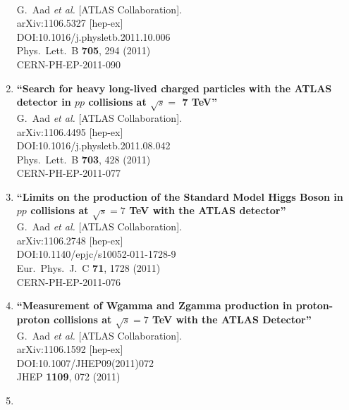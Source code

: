 \documentclass{article}
\begin{document}
\begin{enumerate}
  \\{}G.~Aad {\it et al.} [ATLAS Collaboration].
  \\{}arXiv:1106.5327 [hep-ex]
  \\{}DOI:10.1016/j.physletb.2011.10.006
  \\{}Phys.\ Lett.\ B {\bf 705}, 294 (2011)
  \\{}CERN-PH-EP-2011-090
\item%
{\bf ``Search for heavy long-lived charged particles with the ATLAS detector in $pp$ collisions at $\sqrt{s}=$ 7 TeV''}
  \\{}G.~Aad {\it et al.} [ATLAS Collaboration].
  \\{}arXiv:1106.4495 [hep-ex]
  \\{}DOI:10.1016/j.physletb.2011.08.042
  \\{}Phys.\ Lett.\ B {\bf 703}, 428 (2011)
  \\{}CERN-PH-EP-2011-077
\item%
{\bf ``Limits on the production of the Standard Model Higgs Boson in $pp$ collisions at $\sqrt{s}=7$ TeV with the ATLAS detector''}
  \\{}G.~Aad {\it et al.} [ATLAS Collaboration].
  \\{}arXiv:1106.2748 [hep-ex]
  \\{}DOI:10.1140/epjc/s10052-011-1728-9
  \\{}Eur.\ Phys.\ J.\ C {\bf 71}, 1728 (2011)
  \\{}CERN-PH-EP-2011-076
\item%
{\bf ``Measurement of Wgamma and Zgamma production in proton-proton collisions at $\sqrt{s}=7$ TeV with the ATLAS Detector''}
  \\{}G.~Aad {\it et al.} [ATLAS Collaboration].
  \\{}arXiv:1106.1592 [hep-ex]
  \\{}DOI:10.1007/JHEP09(2011)072
  \\{}JHEP {\bf 1109}, 072 (2011)
\item%

\end{enumerate}
\end{document}
